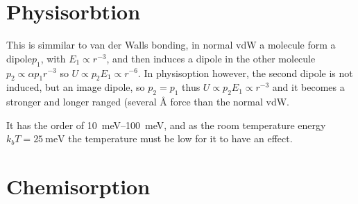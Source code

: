 \documentclass[article,oneside]{memoir}
\begin{document}
\chapter{Physisorbtion}
This is simmilar to van der Walls bonding, in normal vdW a molecule form a dipole$p_1$, with $E_1\propto r^{-3}$, and then induces a dipole in the other molecule $p_2\propto \alpha p_{1}r^{-3}$ so $U\propto p_{2}E_{1}\propto r^{-6}$.
In physisoption however, the second dipole is not induced, but an image dipole, so $p_2 =p_1$ thus $U\propto p_2 E_{1}\propto r^{-3}$ and it becomes a stronger and longer ranged (several \si{\angstrom} force than the normal vdW.

It has the order of \SIrange{10}{100}{\milli\eV}, and as the room temperature energy $k_bT=\SI{25}{\milli\eV}$ the temperature must be low for it to have an effect.


\chapter{Chemisorption}
\end{document}

